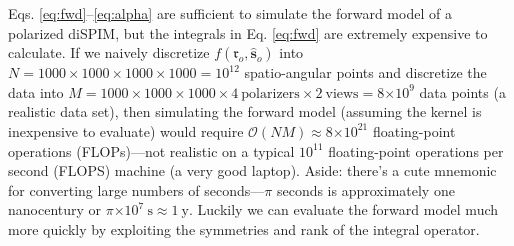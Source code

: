 \documentclass[11pt]{article}
\providecommand{\e}[1]{\ensuremath{\times 10^{#1}}}
\providecommand{\mc}[1]{\mathcal{#1}}
\providecommand{\ro}{\mathbf{\mathfrak{r}}_o}
\providecommand{\so}{\mathbf{\hat{s}}_o}
\begin{document}
Eqs. \ref{eq:fwd}--\ref{eq:alpha} are sufficient to simulate the forward model
of a polarized diSPIM, but the integrals in Eq. \ref{eq:fwd} are extremely
expensive to calculate. If we naively discretize $f(\ro, \so)$ into
$N = 1000 \times 1000 \times 1000 \times 1000 = 10^{12}$ spatio-angular points
and discretize the data into
$M = 1000 \times 1000 \times 1000 \times 4\ \text{polarizers} \times 2\
\text{views} = 8\e{9}$ data points (a realistic data set), then simulating the
forward model (assuming the kernel is inexpensive to evaluate) would require
$\mc{O}(NM) \approx 8\e{21}$ floating-point operations (FLOPs)---not realistic
on a typical $10^{11}$ floating-point operations per second (FLOPS) machine (a
very good laptop). Aside: there's a cute mnemonic for converting large numbers
of seconds---$\pi$ seconds is approximately one nanocentury or
$\pi\e{7}\ \text{s} \approx 1\ \text{y}$. Luckily we can evaluate the forward
model much more quickly by exploiting the symmetries and rank of the integral
operator.
\end{document}
